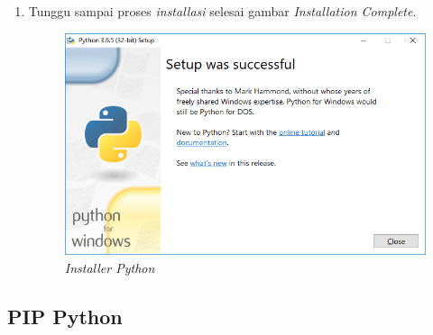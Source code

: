 \begin{enumerate}
\begin{figure}[!htbp]
    \label{Figurepython}
    \end{figure}
\item Tunggu sampai proses \textit{installasi} selesai
 gambar \textit{Installation Complete}.
    \begin{figure}[!htbp]
    \centering
    \includegraphics[scale=0.5]{figures/j.png}
    \caption{\textit{Installer Python}}
    \label{Figurepython}
    \end{figure}
\end{enumerate}
\subsection{PIP Python}
